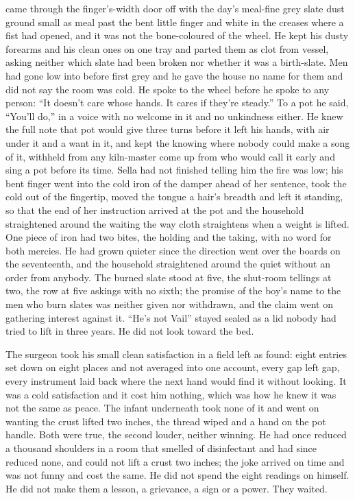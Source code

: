  came through the finger's-width door off  with the day's meal-fine grey slate dust ground small as meal past the bent little finger and white in the creases where a fist had opened, and it was not the bone-coloured  of the wheel. He kept his dusty forearms and his clean ones on one tray and parted them as clot from vessel, asking neither which slate had been broken nor whether it was a birth-slate. Men had gone low into  before first grey and he gave the house no name for them and did not say the room was cold. He spoke to the wheel before he spoke to any person: “It doesn't care whose hands. It cares if they're steady.” To a pot he said, “You'll do,” in a voice with no welcome in it and no unkindness either. He knew the full note that pot would give three turns before it left his hands, with air under it and a want in it, and kept the knowing where nobody could make a song of it, withheld from any kiln-master come up from  who would call it early and sing a pot before its time. Sella had not finished telling him the fire was low; his bent finger went into the cold iron of the damper ahead of her sentence, took the cold out of the fingertip, moved the tongue a hair's breadth and left it standing, so that the end of her instruction arrived at the pot and the household straightened around the waiting the way cloth straightens when a weight is lifted. One piece of iron had two bites, the holding and the taking, with no  word for both mercies. He had grown quieter since the direction went over the boards on the seventeenth, and the household straightened around the quiet without an order from anybody. The burned slate stood at five, the shut-room tellings at two, the row at five askings with no sixth; the promise of the boy's name to the men who burn slates was neither given nor withdrawn, and the claim went on gathering interest against it. “He's not Vail” stayed sealed as a lid nobody had tried to lift in three years. He did not look toward the bed.

The surgeon took his small clean satisfaction in a field left as found: eight entries set down on eight places and not averaged into one account, every gap left gap, every instrument laid back where the next hand would find it without looking. It was a cold satisfaction and it cost him nothing, which was how he knew it was not the same as peace. The infant underneath took none of it and went on wanting the crust lifted two inches, the thread wiped and a hand on the pot handle. Both were true, the second louder, neither winning. He had once reduced a thousand shoulders in a room that smelled of disinfectant and had since reduced none, and could not lift a crust two inches; the joke arrived on time and was not funny and cost the same. He did not spend the eight readings on himself. He did not make them a lesson, a grievance, a sign or a power. They waited.

